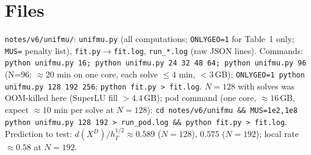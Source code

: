 \documentclass[11pt]{article}
\theoremstyle{remark}
\newcommand{\hG}{h_\Gamma}
\begin{document}
\section{Files}
\texttt{notes/v6/unifmu/}: \texttt{unifmu.py} (all computations; \texttt{ONLYGEO=1} for Table~1 only; \texttt{MUS=} penalty list), \texttt{fit.py}$\to$\texttt{fit.log}, \texttt{run\_*.log} (raw JSON lines). Commands: \texttt{python unifmu.py 16; python unifmu.py 24 32 48 64; python unifmu.py 96} (N=96: $\approx$20 min on one core, each solve $\le4$ min, $<3$\,GB); \texttt{ONLYGEO=1 python unifmu.py 128 192 256}; \texttt{python fit.py > fit.log}. $N=128$ with solves was OOM-killed here (SuperLU fill $>4.4$\,GB); pod command (one core, $\approx16$\,GB, expect $\approx10$ min per solve at $N=128$): \texttt{cd notes/v6/unifmu \&\& MUS=1e2,1e8 python unifmu.py 128 192 > run\_pod.log \&\& python fit.py > fit.log}. Prediction to test: $d(X^D)/\hG^{1/2}\approx0.589$ ($N=128$), $0.575$ ($N=192$); local rate $\approx0.58$ at $N=192$.
\end{document}
